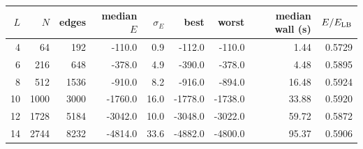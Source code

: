 \begin{tabular}{rrrrrrrrr}
\toprule
$L$ & $N$ & edges & median $E$ & $\sigma_E$ & best & worst & median wall (s) & $E/E_{\rm LB}$ \\
\midrule
4 & 64 & 192 & -110.0 & 0.9 & -112.0 & -110.0 & 1.44 & 0.5729 \\
6 & 216 & 648 & -378.0 & 4.9 & -390.0 & -378.0 & 4.48 & 0.5895 \\
8 & 512 & 1536 & -910.0 & 8.2 & -916.0 & -894.0 & 16.48 & 0.5924 \\
10 & 1000 & 3000 & -1760.0 & 16.0 & -1778.0 & -1738.0 & 33.88 & 0.5920 \\
12 & 1728 & 5184 & -3042.0 & 10.0 & -3048.0 & -3022.0 & 59.72 & 0.5872 \\
14 & 2744 & 8232 & -4814.0 & 33.6 & -4882.0 & -4800.0 & 95.37 & 0.5906 \\
\bottomrule
\end{tabular}

